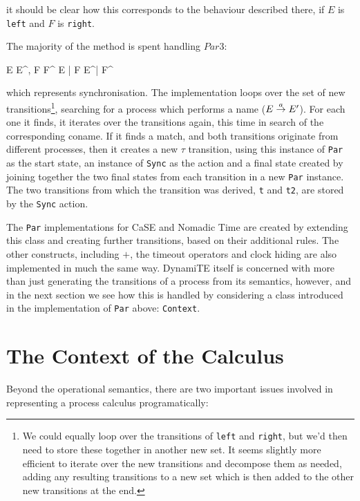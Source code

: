 \noindent it should be clear how this corresponds to the behaviour
described there, if $E$ is \texttt{left} and $F$ is \texttt{right}.

The majority of the method is spent handling $Par3$:

\begin{center}
      {E  E^\prime,
        F  F^\prime}
      {E \;|\; F \derives{\tau} E^\prime \;|\; F^\prime}
      {}
\end{center}

\noindent which represents synchronisation.  The implementation loops
over the set of new transitions\footnote{We could equally loop over
  the transitions of \texttt{left} and \texttt{right}, but we'd then
  need to store these together in another new set.  It seems slightly
  more efficient to iterate over the new transitions and decompose
  them as needed, adding any resulting transitions to a new set which
  is then added to the other new transitions at the end.}, searching
for a process which performs a name ($E \stackrel{a}{\rightarrow} E^\prime$).  For
each one it finds, it iterates over the transitions again, this time
in search of the corresponding coname.  If it finds a match, and both
transitions originate from different processes, then it creates a new
$\tau$ transition, using this instance of \texttt{Par} as the start
state, an instance of \texttt{Sync} as the action and a final state
created by joining together the two final states from each transition
in a new \texttt{Par} instance.  The two transitions from which the
transition was derived, \texttt{t} and \texttt{t2}, are stored by the
\texttt{Sync} action.

The \texttt{Par} implementations for CaSE and Nomadic Time are created
by extending this class and creating further transitions, based on
their additional rules.  The other constructs, including $+$, the
timeout operators and clock hiding are also implemented in much the
same way.  DynamiTE itself is concerned with more than just generating
the transitions of a process from its semantics, however, and in the
next section we see how this is handled by considering a class
introduced in the implementation of \texttt{Par} above:
\texttt{Context}.

\section{The Context of the Calculus}
\label{dyn:context}

Beyond the operational semantics, there are two important issues
involved in representing a process calculus programatically:

